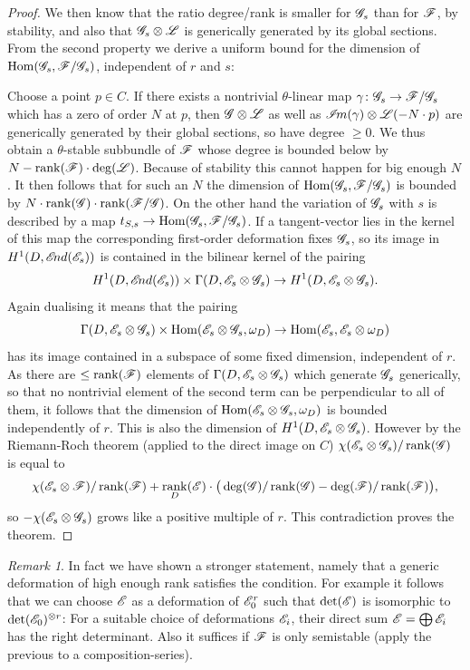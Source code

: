 \documentclass[12pt,english]{smfart}
\DeclareMathOperator{\Hom}{Hom} \DeclareMathOperator{\Ext}{Ext} \DeclareMathOperator{\Der}{Der} \DeclareMathOperator{\rank}{rank} \DeclareMathOperator{\rk}{rk} \DeclareMathOperator{\Spec}{Spec} \DeclareMathOperator{\depth}{depth} \DeclareMathOperator{\genus}{genus} \DeclareMathOperator{\Lie}{Lie} \DeclareMathOperator{\Ad}{Ad} \DeclareMathOperator{\ad}{ad} \DeclareMathOperator{\id}{id} \DeclareMathOperator{\tr}{tr} \DeclareMathOperator{\ch}{ch} \DeclareMathOperator{\Td}{Td} \DeclareMathOperator{\gr}{gr} \DeclareMathOperator{\Pic}{Pic} \DeclareMathOperator{\Aut}{Aut} \DeclareMathOperator{\Out}{Out} \DeclareMathOperator{\Gal}{Gal} \DeclareMathOperator{\PGL}{PGL} \DeclareMathOperator{\GL}{GL} \DeclareMathOperator{\SL}{SL} \DeclareMathOperator{\Ima}{Im} \newcommand{\HDR}{H_{\mathrm{DR}}} \newcommand{\Mpar}{\sM^{0}_{\theta}(\sG)_{\mathrm{par}}}
\theoremstyle{plain} \newtheorem{innerthm}{Theorem} \newtheorem{innerlem}{Lemma} \newtheorem{innerprop}{Proposition} \newtheorem{innercor}{Corollary} \theoremstyle{definition} \newtheorem{innerdefn}{Definition} \newtheorem{innerconstr}{Construction} \theoremstyle{remark} \newtheorem*{remark}{Remark} \newtheorem*{remarks}{Remarks} \newtheorem*{applications}{Applications}
\begin{document}
\begin{proof}
We then know that the ratio degree/rank is smaller for $\mathscr{G}_s$ than for $\mathscr{F}$, by stability, and also that $\mathscr{G}_s\otimes\mathscr{L}$ is generically generated by its global sections. From the second property we derive a uniform bound for the dimension of $\Hom(\sG_s,\sF/\sG_s)$, independent of $r$ and $s$:

Choose a point $p\in C$. If there exists a nontrivial $\theta$-linear map $\gamma\colon\mathscr{G}_s\to\mathscr{F}/\mathscr{G}_s$ which has a zero of order $N$ at $p$, then $\mathscr{G}\otimes\mathscr{L}$ as well as $\mathscr{I}\!m(\gamma)\otimes\mathscr{L}(-N\cdot p)$ are generically generated by their global sections, so have degree $\ge 0$. We thus obtain a $\theta$-stable subbundle of $\mathscr{F}$ whose degree is bounded below by $N-\rank(\sF)\cdot\deg(\sL)$. Because of stability this cannot happen for big enough $N$. It then follows that for such an $N$ the dimension of $\Hom(\sG_s,\sF/\sG_s)$ is bounded by $N\cdot\rank(\sG)\cdot\rank(\sF/\sG)$. On the other hand the variation of $\mathscr{G}_s$ with $s$ is described by a map $t_{S,s}\to\Hom(\sG_s,\sF/\sG_s)$. If a tangent-vector lies in the kernel of this map the corresponding first-order deformation fixes $\mathscr{G}_s$, so its image in $H^1(D,\mathscr{E}\!nd(\mathscr{E}_s))$ is contained in the bilinear kernel of the pairing
\[
H^1(D,\mathscr{E}\!nd(\mathscr{E}_s))\times\Gamma(D,\mathscr{E}_s\otimes\mathscr{G}_s)\to
H^1(D,\mathscr{E}_s\otimes\mathscr{G}_s).
\]
Again dualising it means that the pairing
\[
\Gamma(D,\sE_s\otimes\sG_s)\times\Hom(\sE_s\otimes\sG_s,\omega_D)\to
\Hom(\sE_s,\sE_s\otimes\omega_D)
\]
has its image contained in a subspace of some fixed dimension, independent of $r$. As there are $\le\rank(\sF)$ elements of $\Gamma(D,\mathscr{E}_s\otimes\mathscr{G}_s)$ which generate $\mathscr{G}_s$ generically, so that no nontrivial element of the second term can be perpendicular to all of them, it follows that the dimension of
$\Hom(\sE_s\otimes\sG_s,\omega_D)$ is bounded independently of $r$. This is also the dimension of $H^1(D,\mathscr{E}_s\otimes\mathscr{G}_s)$. However by the Riemann-Roch theorem (applied to the direct image on $C$) $\chi(\sE_s\otimes\sG_s)/\rank(\sG)$ is equal to
\[
\chi(\sE_s\otimes\sF)/\rank(\sF)+\rank_D(\sE)\cdot
\big(\deg(\sG)/\rank(\sG)-\deg(\sF)/\rank(\sF)\big),
\]
so $-\chi(\mathscr{E}_s\otimes\mathscr{G}_s)$ grows like a positive multiple of $r$. This contradiction proves the theorem.
\end{proof}

\begin{remark}
In fact we have shown a stronger statement, namely that a generic deformation of high enough rank satisfies the condition. For example it follows that we can choose $\mathscr{E}$ as a deformation of $\mathscr{E}_0^r$ such that $\det(\mathscr{E})$ is isomorphic to $\det(\mathscr{E}_0)^{\otimes r}$: For a suitable choice of deformations $\mathscr{E}_i$, their direct sum $\mathscr{E}=\bigoplus\mathscr{E}_i$ has the right determinant. Also it suffices if $\mathscr{F}$ is only semistable (apply the previous to a composition-series).
\end{remark}
\end{document}
